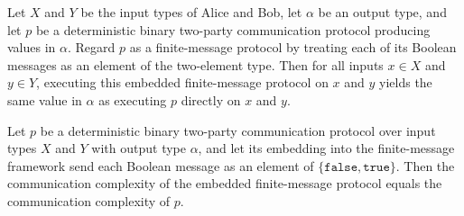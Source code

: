 \begin{theorem}
\label{CommunicationComplexity.Deterministic.FiniteMessage.Protocol.ofProtocol_run}
\leanok
{}
Let $X$ and $Y$ be the input types of Alice and Bob, let $\alpha$ be an output type, and
let $p$ be a deterministic binary two-party communication protocol producing values in
$\alpha$. Regard $p$ as a finite-message protocol by treating each of its Boolean
messages as an element of the two-element type. Then for all inputs $x \in X$ and $y \in
Y$, executing this embedded finite-message protocol on $x$ and $y$ yields the same value
in $\alpha$ as executing $p$ directly on $x$ and $y$.
\end{theorem}

\begin{theorem}
\label{CommunicationComplexity.Deterministic.FiniteMessage.Protocol.ofProtocol_complexity}
\leanok
{}
Let $p$ be a deterministic binary two-party communication protocol over input types $X$
and $Y$ with output type $\alpha$, and let its embedding into the finite-message
framework send each Boolean message as an element of $\{\mathtt{false},\mathtt{true}\}$.
Then the communication complexity of the embedded finite-message protocol equals the
communication complexity of $p$.
\end{theorem}

